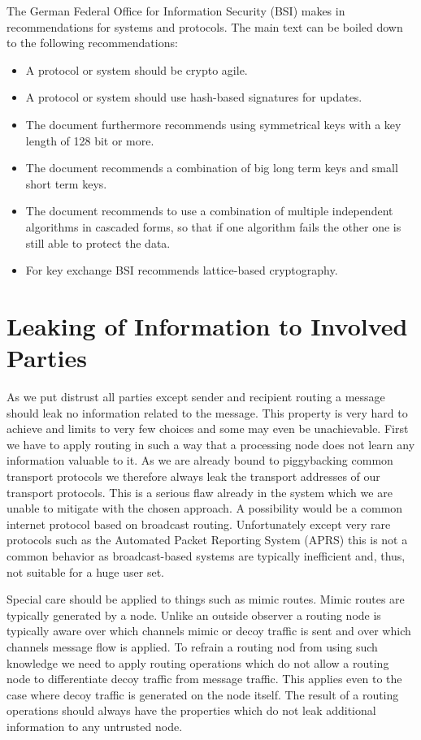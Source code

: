 The German Federal Office for Information Security (BSI) makes in \cite{bsiPostQuantum} recommendations for systems and protocols. The main text can be boiled down to the following recommendations:
\begin{itemize}
	\item A protocol or system should be crypto agile.
	\item A protocol or system should use hash-based signatures for updates.
	\item The document furthermore recommends using symmetrical keys with a key length of 128 bit or more.
	\item The document recommends a combination of big long term keys and small short term keys.
	\item The document recommends to use a combination of multiple independent algorithms in cascaded forms, so that if one algorithm fails the other one is still able to protect the data.
	\item For key exchange BSI recommends lattice-based cryptography.
\end{itemize} 

\section{Leaking of Information to Involved Parties}
As we put distrust all parties except sender and recipient routing a message should leak no information related to the message. This property is very hard to achieve and limits to very few choices and some may even be unachievable. First we have to apply routing in such a way that a processing node does not learn any information valuable to it. As we are already bound to piggybacking common transport protocols we therefore always leak the transport addresses of our transport protocols. This is a serious flaw already in the system which we are unable to mitigate with the chosen approach. A possibility would be a common internet protocol based on broadcast routing. Unfortunately except very rare protocols such as the Automated Packet Reporting System (APRS) this is not a common behavior as broadcast-based systems are typically inefficient and, thus, not suitable for a huge user set.

Special care should be applied to things such as mimic routes. Mimic routes are typically generated by a node. Unlike an outside observer a routing node is typically aware over which channels mimic or decoy traffic is sent and over which channels message flow is applied. To refrain a routing nod from using such knowledge we need to apply routing operations which do not allow a routing node to differentiate decoy traffic from message traffic. This applies even to the case where decoy traffic is generated on the node itself. The result of a routing operations should always have the properties which do not leak additional information to any untrusted node. 

